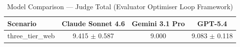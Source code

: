 \begin{table}[htbp]
\centering
\caption{Model Comparison — Judge Total (Evaluator Optimiser Loop Framework)}
\label{tab:model_judge_total}
\begin{tabular}{lccc}
\toprule
Scenario & Claude Sonnet 4.6 & Gemini 3.1 Pro & GPT-5.4 \\
\midrule
three\_tier\_web & 9.415 $\pm$ 0.587 & 9.000 & 9.083 $\pm$ 0.118 \\
\bottomrule
\end{tabular}
\end{table}